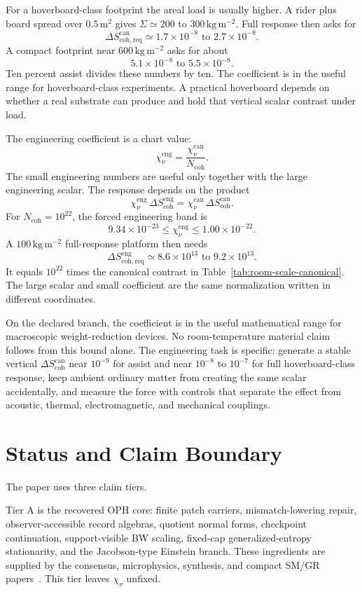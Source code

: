 \documentclass[11pt]{article}
\numberwithin{equation}{section}
\theoremstyle{remark}
\newcommand{\chinu}{\chi_\nu}
\newcommand{\chican}{\chi_\nu^{\mathrm{can}}}
\newcommand{\chieng}{\chi_\nu^{\mathrm{eng}}}
\newcommand{\Ncoh}{N_{\mathrm{coh}}}
\begin{document}
For a hoverboard-class footprint the areal load is usually higher. A rider plus
board spread over \(0.5\,\mathrm{m^2}\) gives
\(\Sigma\simeq200\) to \(300\,\mathrm{kg\,m^{-2}}\). Full response then asks for
\[
\Delta S_{\mathrm{coh,req}}^{\mathrm{can}}
\simeq
1.7\times10^{-8}\text{ to }2.7\times10^{-8}.
\]
A compact footprint near \(600\,\mathrm{kg\,m^{-2}}\) asks for about
\[
5.1\times10^{-8}\text{ to }5.5\times10^{-8}.
\]
Ten percent assist divides these numbers by ten. The coefficient is in the
useful range for hoverboard-class experiments. A practical hoverboard
depends on whether a real substrate can produce and hold that vertical scalar
contrast under load.

The engineering coefficient is a chart value:
\[
\chieng=\frac{\chican}{\Ncoh}.
\]
The small engineering numbers are useful only together with the large
engineering scalar. The response depends on the product
\[
\chieng\,\Delta S_{\mathrm{coh}}^{\mathrm{eng}}
=
\chican\,\Delta S_{\mathrm{coh}}^{\mathrm{can}}.
\]
For \(\Ncoh=10^{22}\), the forced engineering band is
\[
9.34\times10^{-23}
\le
\chieng
\le
1.00\times10^{-22}.
\]
A \(100\,\mathrm{kg\,m^{-2}}\) full-response platform then needs
\[
\Delta S_{\mathrm{coh,req}}^{\mathrm{eng}}\simeq
8.6\times10^{13}\text{ to }9.2\times10^{13}.
\]
It equals \(10^{22}\) times the canonical contrast in
Table~\ref{tab:room-scale-canonical}. The large scalar and small coefficient
are the same normalization written in different coordinates.

On the declared branch, the coefficient is in the useful mathematical range for
macroscopic weight-reduction devices. No room-temperature material claim follows
from this bound alone. The engineering task is specific: generate a stable vertical
\(\Delta S_{\mathrm{coh}}^{\mathrm{can}}\) near \(10^{-9}\) for assist and near
\(10^{-8}\) to \(10^{-7}\) for full hoverboard-class response, keep ambient
ordinary matter from creating the same scalar accidentally, and measure the
force with controls that separate the effect from acoustic, thermal,
electromagnetic, and mechanical couplings.

\section{Status and Claim Boundary}

The paper uses three claim tiers.

Tier A is the recovered OPH core: finite patch carriers, mismatch-lowering
repair, observer-accessible record algebras, quotient normal forms, checkpoint
continuation, support-visible BW scaling, fixed-cap generalized-entropy
stationarity, and the Jacobson-type Einstein branch. These ingredients are
supplied by the consensus, microphysics, synthesis, and compact SM/GR
papers~\cite{oph-consensus,oph-micro,oph-synthesis,oph-compact}. This tier leaves
\(\chinu\) unfixed.
\end{document}
